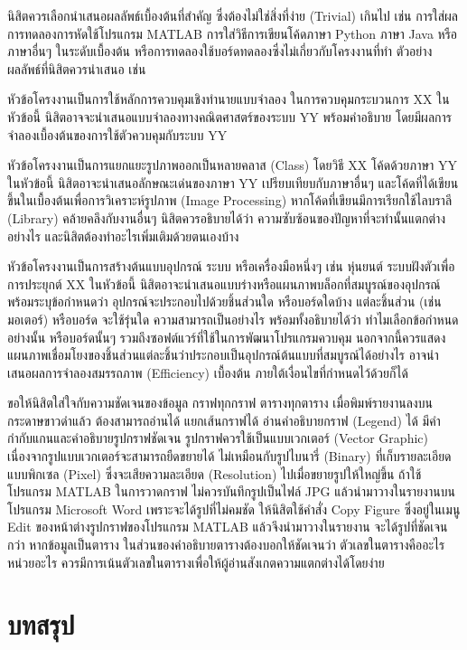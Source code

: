 \documentclass[11pt,a4paper]{article}
\begin{document}
นิสิตควรเลือกนำเสนอผลลัพธ์เบื้องต้นที่สำคัญ ซึ่งต้องไม่ใช่สิ่งที่ง่าย (Trivial) เกินไป เช่น การใส่ผลการทดลองการหัดใช้โปรแกรม MATLAB การใส่วิธีการเขียนโค้ดภาษา Python ภาษา Java หรือภาษาอื่นๆ ในระดับเบื้องต้น หรือการทดลองใช้บอร์ดทดลองซึ่งไม่เกี่ยวกับโครงงานที่ทำ ตัวอย่างผลลัพธ์ที่นิสิตควรนำเสนอ เช่น


หัวข้อโครงงานเป็นการใช้หลักการควบคุมเชิงทำนายแบบจำลอง ในการควบคุมกระบวนการ XX ในหัวข้อนี้ นิสิตอาจจะนำเสนอแบบจำลองทางคณิตศาสตร์ของระบบ YY พร้อมคำอธิบาย โดยมีผลการจำลองเบื้องต้นของการใช้ตัวควบคุมกับระบบ YY


หัวข้อโครงงานเป็นการแยกแยะรูปภาพออกเป็นหลายคลาส (Class) โดยวิธี XX โค้ดด้วยภาษา YY ในหัวข้อนี้ นิสิตอาจะนำเสนอลักษณะเด่นของภาษา YY เปรียบเทียบกับภาษาอื่นๆ และโค้ดที่ได้เขียนขึ้นในเบื้องต้นเพื่อการวิเคราะห์รูปภาพ (Image Processing) หากโค้ดที่เขียนมีการเรียกใช้ไลบราลี (Library) คล้ายคลึงกับงานอื่นๆ นิสิตควรอธิบายได้ว่า ความซับซ้อนของปัญหาที่จะทำนั้นแตกต่างอย่างไร และนิสิตต้องทำอะไรเพิ่มเติมด้วยตนเองบ้าง


หัวข้อโครงงานเป็นการสร้างต้นแบบอุปกรณ์ ระบบ หรือเครื่องมือหนึ่งๆ เช่น หุ่นยนต์ ระบบฝังตัวเพื่อการประยุกต์ XX ในหัวข้อนี้ นิสิตอาจะนำเสนอแบบร่างหรือแผนภาพบล็อกที่สมบูรณ์ของอุปกรณ์พร้อมระบุข้อกำหนดว่า อุปกรณ์จะประกอบไปด้วยชิ้นส่วนใด หรือบอร์ดใดบ้าง แต่ละชิ้นส่วน (เช่น มอเตอร์) หรือบอร์ด จะใช้รุ่นใด ความสามารถเป็นอย่างไร พร้อมทั้งอธิบายได้ว่า ทำไมเลือกข้อกำหนดอย่างนั้น หรือบอร์ดนั้นๆ รวมถึงซอฟต์แวร์ที่ใช้ในการพัฒนาโปรแกรมควบคุม นอกจากนี้ควรแสดงแผนภาพเชื่อมโยงของชิ้นส่วนแต่ละชิ้นว่าประกอบเป็นอุปกรณ์ต้นแบบที่สมบูรณ์ได้อย่างไร อาจนำเสนอผลการจำลองสมรรถภาพ (Efficiency) เบื้องต้น ภายใต้เงื่อนไขที่กำหนดไว้ด้วยก็ได้


ขอให้นิสิตใส่ใจกับความชัดเจนของข้อมูล กราฟทุกกราฟ ตารางทุกตาราง เมื่อพิมพ์รายงานลงบนกระดาษขาวดำแล้ว ต้องสามารถอ่านได้ แยกเส้นกราฟได้ อ่านคำอธิบายกราฟ (Legend) ได้ มีคำกำกับแกนและคำอธิบายรูปกราฟชัดเจน รูปกราฟควรใช้เป็นแบบเวกเตอร์ (Vector Graphic) เนื่องจากรูปแบบเวกเตอร์จะสามารถยืดขยายได้ ไม่เหมือนกับรูปไบนารี่ (Binary) ที่เก็บรายละเอียดแบบพิกเซล (Pixel) ซึ่งจะเสียความละเอียด (Resolution) ไปเมื่อขยายรูปให้ใหญ่ขึ้น ถ้าใช้โปรแกรม MATLAB ในการวาดกราฟ ไม่ควรบันทึกรูปเป็นไฟล์ JPG แล้วนำมาวางในรายงานบนโปรแกรม Microsoft Word เพราะจะได้รูปที่ไม่คมชัด ให้นิสิตใช้คำสั่ง Copy Figure ซึ่งอยู่ในเมนู Edit ของหน้าต่างรูปกราฟของโปรแกรม MATLAB แล้วจึงนำมาวางในรายงาน จะได้รูปที่ชัดเจนกว่า หากข้อมูลเป็นตาราง ในส่วนของคำอธิบายตารางต้องบอกให้ชัดเจนว่า ตัวเลขในตารางคืออะไร หน่วยอะไร ควรมีการเน้นตัวเลขในตารางเพื่อให้ผู้อ่านสังเกตความแตกต่างได้โดยง่าย

\section{บทสรุป}
\end{document}
